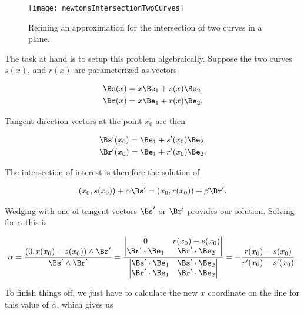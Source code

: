 \begin{figure}[htp]
\centering
\texttt{[image: newtonsIntersectionTwoCurves]}
\caption{Refining an approximation for the intersection of two curves in a plane.}\label{fig:newtonsIntersectionTwoCurves}
\end{figure}

The task at hand is to setup this problem algebraically.  Suppose the two curves $s(x)$, and $r(x)$ are parameterized as vectors

\begin{align}\label{eqn:intersectionNewton:40}
\Bs(x) &= x \Be_1 + s(x) \Be_2 \\
\Br(x) &= x \Be_1 + r(x) \Be_2.
\end{align}

Tangent direction vectors at the point $x_0$ are then

\begin{align}\label{eqn:intersectionNewton:41}
\Bs'(x_0) &= \Be_1 + s'(x_0) \Be_2 \\
\Br'(x_0) &= \Be_1 + r'(x_0) \Be_2.
\end{align}

The intersection of interest is therefore the solution of

\begin{align}\label{eqn:intersectionNewton:42}
(x_0, s(x_0)) + \alpha \Bs' = (x_0, r(x_0)) + \beta \Br'.
\end{align}

Wedging with one of tangent vectors $\Bs'$ or $\Br'$ provides our solution.  Solving for $\alpha$ this is

\begin{align}\label{eqn:intersectionNewton:43}
\alpha = \frac{(0, r(x_0) - s(x_0)) \wedge \Br'}{\Bs' \wedge \Br'} 
= 
\frac
{
\begin{vmatrix}
0 & r(x_0) - s(x_0) \\
\Br' \cdot \Be_1 & \Br' \cdot \Be_2 
\end{vmatrix}
}
{
\begin{vmatrix}
\Bs' \cdot \Be_1 & \Bs' \cdot \Be_2 \\
\Br' \cdot \Be_1 & \Br' \cdot \Be_2 
\end{vmatrix}
}
= 
-
\frac
{
r(x_0) - s(x_0)
}
{
r'(x_0) - s'(x_0) 
}.
\end{align}

To finish things off, we just have to calculate the new $x$ coordinate on the line for this value of $\alpha$, which gives us

